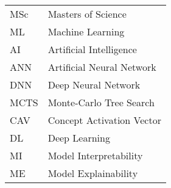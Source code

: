 
\listoffixmes{}

\begin{tabular}{ll}
MSc &Masters of Science\\
ML & Machine Learning\\
AI & Artificial Intelligence\\
ANN & Artificial Neural Network\\
DNN & Deep Neural Network\\
MCTS & Monte-Carlo Tree Search\\
CAV & Concept Activation Vector\\
DL & Deep Learning\\
MI & Model Interpretability\\
ME & Model Explainability\\

\end{tabular}
\overfullrule=0pt